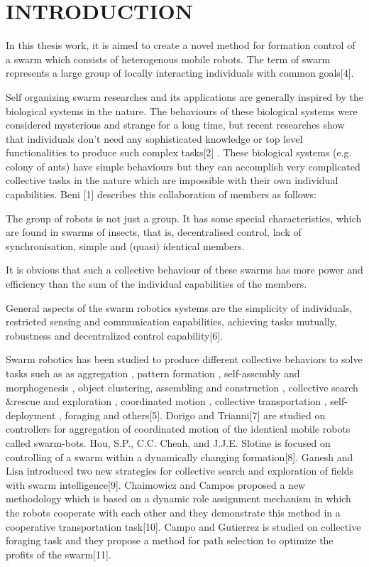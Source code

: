 

\chapter{INTRODUCTION}
\label{chp:introduction}

In this thesis work, it is aimed to create a novel method for formation control of a swarm which consists of heterogenous mobile robots. The term of swarm represents a large group of locally interacting individuals with common goals[4]. 

Self organizing swarm researches and its applications are generally inspired by the biological systems in the nature. 
The behaviours of these biological systems were considered mysterious and strange for a long time, but recent researches show that individuals don't need any sophisticated knowledge or top level functionalities to produce such complex tasks[2] . These biological systems (e.g. colony of ants) have simple behaviours but they can accomplish very complicated collective tasks in the nature which are impossible with their own individual capabilities. Beni [1] describes this collaboration of members as follows:

The group of robots is not just a group. It has some special characteristics, which are found in swarms of insects, that is, decentralised control, lack of synchronisation, simple and (quasi) identical members.

It is obvious that such a collective behaviour of these swarms has more power and efficiency than the sum of the individual capabilities of the members. 

General aspects of the swarm robotics systems are the simplicity of individuals, restricted sensing and communication capabilities, achieving tasks mutually, robustness and decentralized control capability[6].

Swarm robotics has been studied to produce different collective behaviors to solve tasks such as as aggregation , pattern formation , self-assembly and morphogenesis , object clustering, assembling and construction , collective search$\&$rescue and exploration , coordinated motion , collective transportation , self-deployment , foraging and others[5]. Dorigo and Trianni[7] are studied on controllers for aggregation of coordinated motion of the identical mobile robots called swarm-bots.  Hou, S.P., C.C. Cheah, and J.J.E. Slotine is focused on controlling of a swarm within a dynamically changing formation[8]. Ganesh and Lisa introduced two new strategies for collective search and exploration of fields with swarm intelligence[9]. Chaimowicz and Campos proposed a new methodology which is based on a dynamic role assignment mechanism in which the robots cooperate with each other and they demonstrate this method in a cooperative transportation task[10].  Campo and Gutierrez is studied on collective foraging task and they propose a method for path selection to optimize the profits of the swarm[11].

